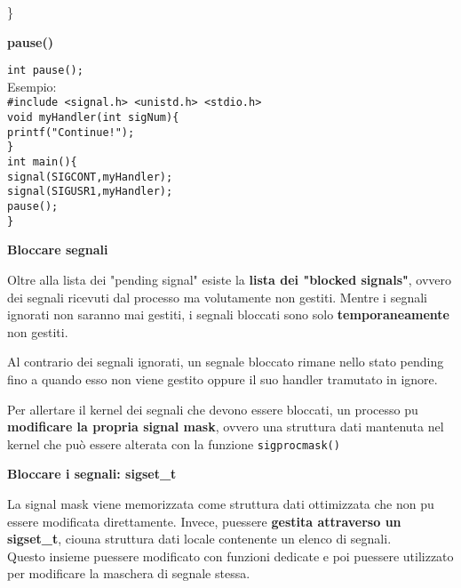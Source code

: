 \begin{flushleft}
\begin{flushleft}
{            \}}
  \end{flushleft}
  \begin{flushleft}
    \textbf{pause()}\par
    \texttt{int pause();}\\
    Esempio:\\
    \texttt{\#include <signal.h> <unistd.h> <stdio.h> \\
            void myHandler(int sigNum)\{\\
            \halftab printf("Continue!\n"); \\
            \}\\
            int main()\{\\
            \halftab signal(SIGCONT,myHandler);\\
            \halftab signal(SIGUSR1,myHandler);\\
            \halftab pause();\\
            \}}
  \end{flushleft}
  \begin{flushleft}
    \textbf{Bloccare segnali}\par 
    Oltre alla lista dei "pending signal" esiste la \textbf{lista dei "blocked signals"}, ovvero dei 
    segnali ricevuti dal processo ma volutamente non gestiti. Mentre i segnali ignorati 
    non saranno mai gestiti, i segnali bloccati sono solo \textbf{temporaneamente} non gestiti.\par
    \begin{flushleft}
      Al contrario dei segnali ignorati, un segnale bloccato rimane nello stato pending fino 
      a quando esso non viene gestito oppure il suo handler tramutato in ignore. 
    \end{flushleft}
    Per allertare il kernel dei segnali che devono essere bloccati, un processo pu\aco
    \textbf{modificare la propria signal mask}, ovvero una struttura dati mantenuta nel kernel 
    che può essere alterata con la funzione \texttt{sigprocmask()}
    \begin{flushleft}
      \textbf{Bloccare i segnali: sigset\_t}\par
      La signal mask viene memorizzata come struttura dati ottimizzata che non pu\aco
      essere modificata direttamente. Invece, pu\aco essere \textbf{gestita attraverso un sigset\_t}, 
      cio\ace una struttura dati locale contenente un elenco di segnali.\\
      Questo insieme pu\aco essere modificato con funzioni dedicate e poi 
      pu\aco essere utilizzato per modificare la maschera di segnale stessa.

\end{flushleft}
\end{flushleft}
\end{flushleft}
